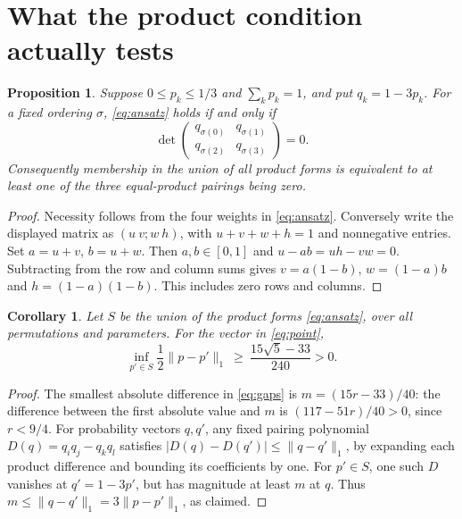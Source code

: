 \documentclass[11pt]{article}
\newtheorem{proposition}[theorem]{Proposition}
\newtheorem{corollary}[theorem]{Corollary}
\begin{document}
\section{What the product condition actually tests}
\begin{proposition}\label{prop:rankone}
Suppose $0\le p_k\le1/3$ and $\sum_kp_k=1$, and put $q_k=1-3p_k$.
For a fixed ordering $\sigma$, \eqref{eq:ansatz} holds if and only if
\[
 \det\begin{pmatrix}
 q_{\sigma(0)}&q_{\sigma(1)}\\
 q_{\sigma(2)}&q_{\sigma(3)}
 \end{pmatrix}=0.
\]
Consequently membership in the union of all product forms is equivalent
to at least one of the three equal-product pairings being zero.
\end{proposition}
\begin{proof}
Necessity follows from the four weights in \eqref{eq:ansatz}.
Conversely write the displayed matrix as $(u\ v;w\ h)$, with
$u+v+w+h=1$ and nonnegative entries. Set $a=u+v$, $b=u+w$.
Then $a,b\in[0,1]$ and $u-ab=uh-vw=0$. Subtracting from the row
and column sums gives $v=a(1-b)$, $w=(1-a)b$ and
$h=(1-a)(1-b)$. This includes zero rows and columns.
\end{proof}

\begin{corollary}\label{cor:distance}
Let $S$ be the union of the product forms \eqref{eq:ansatz}, over all
permutations and parameters. For the vector in \eqref{eq:point},
\[
 \inf_{p'\in S}\frac12\|p-p'\|_1\ \ge\
 \frac{15\sqrt5-33}{240}>0.
\]
\end{corollary}
\begin{proof}
The smallest absolute difference in \eqref{eq:gaps} is
$m=(15r-33)/40$: the difference between the first absolute value and
$m$ is $(117-51r)/40>0$, since $r<9/4$.
For probability vectors $q,q'$, any fixed pairing polynomial
$D(q)=q_iq_j-q_kq_l$ satisfies
$|D(q)-D(q')|\le\|q-q'\|_1$, by expanding each product difference
and bounding its coefficients by one. For $p'\in S$, one such
$D$ vanishes at $q'=1-3p'$, but has magnitude at least $m$ at $q$.
Thus $m\le\|q-q'\|_1=3\|p-p'\|_1$, as claimed.
\end{proof}
\end{document}
